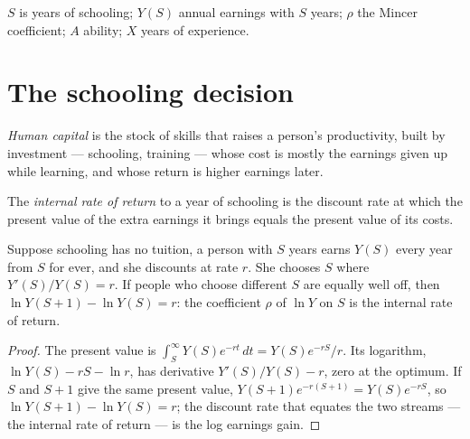 \begin{notation}\label{not:b3:human-capital:symbols}
$S$ is years of schooling; $Y(S)$ annual earnings with $S$ years; $\rho$ the Mincer coefficient;
$A$ ability; $X$ years of experience.
\end{notation}

\section{The schooling decision}\label{sec:b3:human-capital:decision}

\begin{definition}\label{def:b3:human-capital:human-capital}
\emph{Human capital} is the stock of skills that raises a person's productivity,
built by investment --- schooling, training --- whose cost is mostly the earnings
given up while learning, and whose return is higher earnings later.
\end{definition}

\begin{definition}\label{def:b3:human-capital:irr}
The \emph{internal rate of return} to a year of schooling is the discount rate at
which the present value of the extra earnings it brings equals the present value
of its costs.
\end{definition}

\begin{proposition}\label{prop:b3:human-capital:stopping}
Suppose schooling has no tuition, a person with $S$ years earns $Y(S)$ every year from $S$ for
ever, and she discounts at rate $r$. She chooses $S$ where $Y'(S)/Y(S) = r$. If people who choose
different $S$ are equally well off, then $\ln Y(S+1) - \ln Y(S) = r$: the coefficient $\rho$ of $\ln Y$ on $S$ is the
internal rate of return.
\end{proposition}

\begin{proof}
The present value is $\int_S^\infty Y(S)e^{-rt}\,dt = Y(S)e^{-rS}/r$. Its logarithm, $\ln Y(S) - rS - \ln r$, has derivative
$Y'(S)/Y(S) - r$, zero at the optimum. If $S$ and $S + 1$ give the same present value, $Y(S+1)e^{-r(S+1)} =
Y(S)e^{-rS}$, so $\ln Y(S+1) - \ln Y(S) = r$; the discount rate that equates the two streams --- the internal
rate of return --- is the log earnings gain.
\end{proof}

